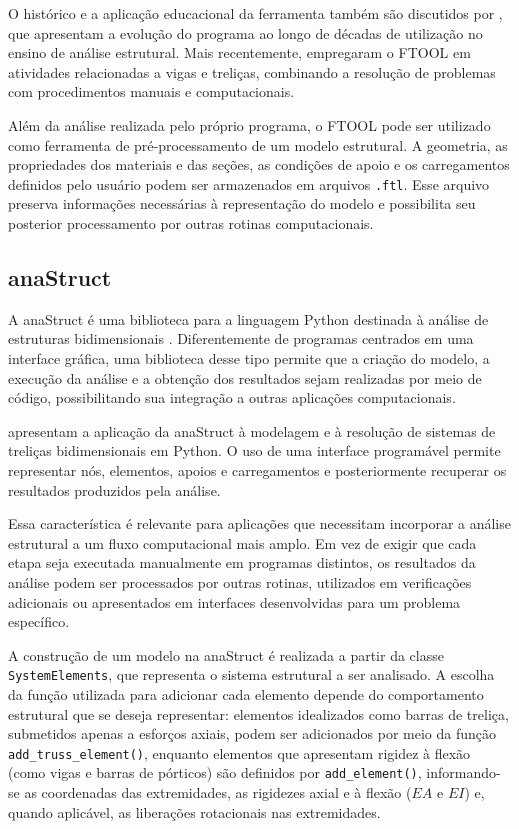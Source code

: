 O histórico e a aplicação educacional da ferramenta também são discutidos por , que apresentam a evolução do programa ao longo de décadas de utilização no ensino de análise estrutural. Mais recentemente,  empregaram o \gls{FTOOL} em atividades relacionadas a vigas e treliças, combinando a resolução de problemas com procedimentos manuais e computacionais.

Além da análise realizada pelo próprio programa, o \gls{FTOOL} pode ser utilizado como ferramenta de pré-processamento de um modelo estrutural. A geometria, as propriedades dos materiais e das seções, as condições de apoio e os carregamentos definidos pelo usuário podem ser armazenados em arquivos \texttt{.ftl}. Esse arquivo preserva informações necessárias à representação do modelo e possibilita seu posterior processamento por outras rotinas computacionais.

\subsection{anaStruct}
\label{subsec:anastruct}

A anaStruct é uma biblioteca para a linguagem Python destinada à análise de estruturas bidimensionais \cite{vink2026anastruct}. Diferentemente de programas centrados em uma interface gráfica, uma biblioteca desse tipo permite que a criação do modelo, a execução da análise e a obtenção dos resultados sejam realizadas por meio de código, possibilitando sua integração a outras aplicações computacionais.

 apresentam a aplicação da anaStruct à modelagem e à resolução de sistemas de treliças bidimensionais em Python. O uso de uma interface programável permite representar nós, elementos, apoios e carregamentos e posteriormente recuperar os resultados produzidos pela análise.

Essa característica é relevante para aplicações que necessitam incorporar a análise estrutural a um fluxo computacional mais amplo. Em vez de exigir que cada etapa seja executada manualmente em programas distintos, os resultados da análise podem ser processados por outras rotinas, utilizados em verificações adicionais ou apresentados em interfaces desenvolvidas para um problema específico.

A construção de um modelo na anaStruct é realizada a partir da classe \texttt{SystemElements}, que representa o sistema estrutural a ser analisado. A escolha da função utilizada para adicionar cada elemento depende do comportamento estrutural que se deseja representar: elementos idealizados como barras de treliça, submetidos apenas a esforços axiais, podem ser adicionados por meio da função \texttt{add\_truss\_element()}, enquanto elementos que apresentam rigidez à flexão (como vigas e barras de pórticos) são definidos por \texttt{add\_element()}, informando-se as coordenadas das extremidades, as rigidezes axial e à flexão (\(EA\) e \(EI\)) e, quando aplicável, as liberações rotacionais nas extremidades.

